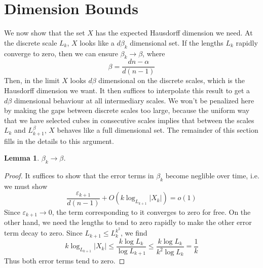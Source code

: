 \documentclass{article}
\theoremstyle{plain}
\newtheorem{lemma}{Lemma}
\theoremstyle{plain}
\begin{document}
%
%

\section{Dimension Bounds}

We now show that the set $X$ has the expected Hausdorff dimension we need. At the discrete scale $L_k$, $X$ looks like a $d \beta_k$ dimensional set. If the lengths $L_k$ rapidly converge to zero, then we can ensure $\beta_k \to \beta$, where
%
\[ \beta = \frac{dn - \alpha}{d(n - 1)} \]
%
Then, in the limit $X$ looks $d \beta$ dimensional on the discrete scales, which is the Hausdorff dimension we want. It then suffices to interpolate this result to get a $d\beta$ dimensional behaviour at all intermediary scales. We won't be penalized here by making the gaps between discrete scales too large, because the uniform way that we have selected cubes in consecutive scales implies that between the scales $L_k$ and $L_{k+1}^\beta$, $X$ behaves like a full dimensional set. The remainder of this section fills in the details to this argument.

\begin{lemma}
	$\beta_k \to \beta$.
\end{lemma}
\begin{proof}
	It suffices to show that the error terms in $\beta_k$ become neglible over time, i.e. we must show
	\[ \frac{\varepsilon_{k+1}}{d(n-1)} + O(k \log_{L_{k+1}} |X_k|) = o(1) \]
	Since $\varepsilon_{k+1} \to 0$, the term corresponding to it converges to zero for free. On the other hand, we need the lengths to tend to zero rapidly to make the other error term decay to zero. Since $L_{k+1} \leq L_k^{k^2}$, we find
	\[ k \log_{L_{k+1}} |X_k| \leq \frac{k \log L_k}{\log L_{k+1}} \leq \frac{k \log L_k}{k^2 \log L_k} = \frac{1}{k} \]
	Thus both error terms tend to zero.
\end{proof}
\end{document}
